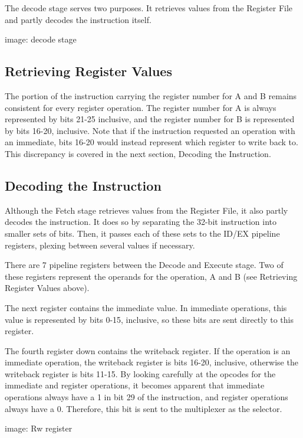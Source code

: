 The decode stage serves two purposes. It retrieves values from the
Register File and partly decodes the instruction itself.

image: decode stage

\subsection{Retrieving Register
Values}\label{retrieving-register-values}

The portion of the instruction carrying the register number for A and B
remains consistent for every register operation. The register number for
A is always represented by bits 21-25 inclusive, and the register number
for B is represented by bits 16-20, inclusive. Note that if the
instruction requested an operation with an immediate, bits 16-20 would
instead represent which register to write back to. This discrepancy is
covered in the next section, Decoding the Instruction.

\subsection{Decoding the Instruction}\label{decoding-the-instruction}

Although the Fetch stage retrieves values from the Register File, it
also partly decodes the instruction. It does so by separating the 32-bit
instruction into smaller sets of bits. Then, it passes each of these
sets to the ID/EX pipeline registers, plexing between several values if
necessary.

There are 7 pipeline registers between the Decode and Execute stage. Two
of these registers represent the operands for the operation, A and B
(see Retrieving Register Values above).

The next register contains the immediate value. In immediate operations,
this value is represented by bits 0-15, inclusive, so these bits are
sent directly to this register.

The fourth register down contains the writeback register. If the
operation is an immediate operation, the writeback register is bits
16-20, inclusive, otherwise the writeback register is bits 11-15. By
looking carefully at the opcodes for the immediate and register
operations, it becomes apparent that immediate operations always have a
1 in bit 29 of the instruction, and register operations always have a 0.
Therefore, this bit is sent to the multiplexer as the selector.

image: Rw register

